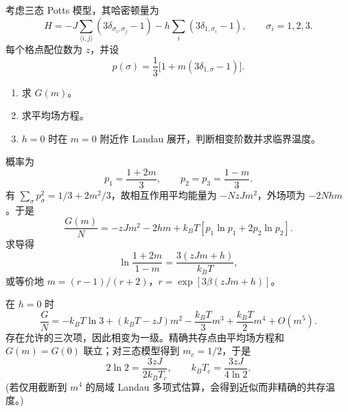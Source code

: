 \begin{question}
考虑三态 Potts 模型，其哈密顿量为
\[H=-J\sum_{\langle i,j\rangle}(3\delta_{\sigma_i,\sigma_j}-1)-h\sum_i(3\delta_{1,\sigma_i}-1),\qquad \sigma_i=1,2,3.\]
每个格点配位数为 $z$，并设
\[p(\sigma)=\frac13\bigl[1+m(3\delta_{1,\sigma}-1)\bigr].\]
\begin{enumerate}
\item 求 $G(m)$。
\item 求平均场方程。
\item $h=0$ 时在 $m=0$ 附近作 Landau 展开，判断相变阶数并求临界温度。
\end{enumerate}
\begin{solution}
概率为
\[p_1=\frac{1+2m}{3},\qquad p_2=p_3=\frac{1-m}{3}.\]
有 $\sum_\sigma p_\sigma^2=1/3+2m^2/3$，故相互作用平均能量为 $-NzJm^2$，外场项为 $-2Nhm$。于是
\[\boxed{\frac{G(m)}{N}=-zJm^2-2hm+k_BT\left[p_1\ln p_1+2p_2\ln p_2\right]}.\]
求导得
\[\boxed{\ln\frac{1+2m}{1-m}=\frac{3(zJm+h)}{k_BT}},\]
或等价地 $m=(r-1)/(r+2)$，$r=\exp[3\beta(zJm+h)]$。

在 $h=0$ 时
\[\frac{G}{N}=-k_BT\ln3+(k_BT-zJ)m^2-\frac{k_BT}{3}m^3+\frac{k_BT}{2}m^4+O(m^5).\]
存在允许的三次项，因此相变为一级。精确共存点由平均场方程和 $G(m)=G(0)$ 联立；对三态模型得到 $m_c=1/2$，于是
\[2\ln2=\frac{3zJ}{2k_BT_c},\qquad \boxed{k_BT_c=\frac{3zJ}{4\ln2}}.\]
(若仅用截断到 $m^4$ 的局域 Landau 多项式估算，会得到近似而非精确的共存温度。)
\end{solution}
\end{question}

